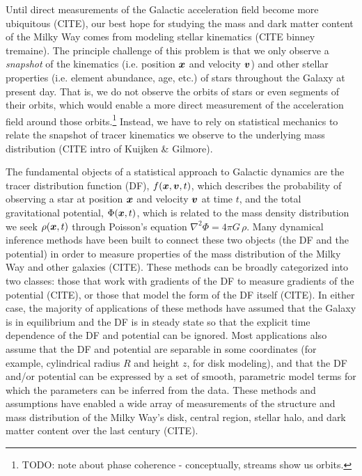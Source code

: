 Until direct measurements of the Galactic acceleration field become more ubiquitous
(CITE), our best hope for studying the mass and dark matter content of the Milky Way
comes from modeling stellar kinematics (CITE binney tremaine).
The principle challenge of this problem is that we only observe a \emph{snapshot} of the
kinematics (i.e. position $\boldsymbol{x}$ and velocity $\boldsymbol{v}$) and other stellar properties
(i.e. element abundance, age, etc.) of stars throughout the Galaxy at present day.
That is, we do not observe the orbits of stars or even segments of their orbits, which
would enable a more direct measurement of the acceleration field around those
orbits.\footnote{TODO: note about phase coherence - conceptually, streams show us
orbits.}
Instead, we have to rely on statistical mechanics to relate the snapshot of tracer
kinematics we observe to the underlying mass distribution (CITE intro of Kuijken \&
Gilmore).

The fundamental objects of a statistical approach to Galactic dynamics are the tracer
distribution function (DF), $f(\boldsymbol{x}, \boldsymbol{v}, t)$, which describes the probability of
observing a star at position $\boldsymbol{x}$ and velocity $\boldsymbol{v}$ at time $t$, and the total
gravitational potential, $\Phi(\boldsymbol{x}, t)$, which is related to the mass density
distribution we seek $\rho(\boldsymbol{x}, t)$ through Poisson's equation $\nabla^2 \Phi = 4\pi
G \, \rho$.
Many dynamical inference methods have been built to connect these two objects (the DF
and the potential) in order to measure properties of the mass distribution of the Milky
Way and other galaxies (CITE).
These methods can be broadly categorized into two classes: those that work with
gradients of the DF to measure gradients of the potential (CITE), or those that model
the form of the DF itself (CITE).
In either case, the majority of applications of these methods have assumed that the
Galaxy is in equilibrium and the DF is in steady state so that the explicit time
dependence of the DF and potential can be ignored.
Most applications also assume that the DF and potential are separable in some
coordinates (for example, cylindrical radius $R$ and height $z$, for disk modeling), and
that the DF and/or potential can be expressed by a set of smooth, parametric model terms
for which the parameters can be inferred from the data.
These methods and assumptions have enabled a wide array of measurements of the structure
and mass distribution of the Milky Way's disk, central region, stellar halo, and dark
matter content over the last century (CITE).

